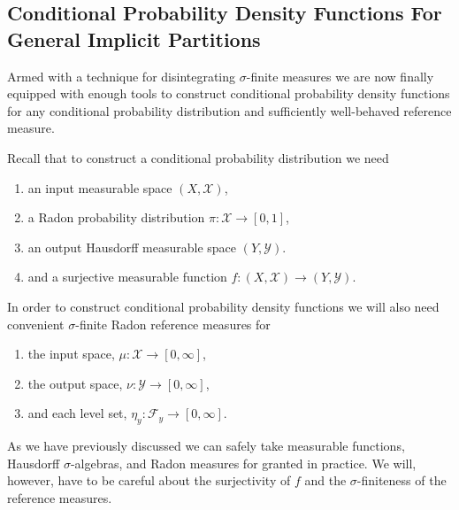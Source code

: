 \documentclass[
  letterpaper,
  DIV=11,
  numbers=noendperiod]{scrartcl}
\providecommand{\tightlist}{%
  \setlength{\itemsep}{0pt}\setlength{\parskip}{0pt}}\usepackage{longtable,booktabs,array}
\begin{document}
\subsection{Conditional Probability Density Functions For General
Implicit
Partitions}\label{conditional-probability-density-functions-for-general-implicit-partitions}

Armed with a technique for disintegrating \(\sigma\)-finite measures we
are now finally equipped with enough tools to construct conditional
probability density functions for any conditional probability
distribution and sufficiently well-behaved reference measure.

Recall that to construct a conditional probability distribution we need

\begin{enumerate}
\def\labelenumi{\arabic{enumi}.}
\tightlist
\item
  an input measurable space \((X, \mathcal{X})\),
\item
  a Radon probability distribution
  \(\pi : \mathcal{X} \rightarrow [0, 1]\),
\item
  an output Hausdorff measurable space \((Y, \mathcal{Y})\).
\item
  and a surjective measurable function
  \(f: (X, \mathcal{X}) \rightarrow (Y, \mathcal{Y})\).
\end{enumerate}

In order to construct conditional probability density functions we will
also need convenient \(\sigma\)-finite Radon reference measures for

\begin{enumerate}
\def\labelenumi{\arabic{enumi}.}
\setcounter{enumi}{4}
\tightlist
\item
  the input space, \(\mu : \mathcal{X} \rightarrow [0, \infty]\),
\item
  the output space, \(\nu : \mathcal{Y} \rightarrow [0, \infty]\),
\item
  and each level set,
  \(\eta_{y} : \mathcal{F}_{y} \rightarrow [0, \infty]\).
\end{enumerate}

As we have previously discussed we can safely take measurable functions,
Hausdorff \(\sigma\)-algebras, and Radon measures for granted in
practice. We will, however, have to be careful about the surjectivity of
\(f\) and the \(\sigma\)-finiteness of the reference measures.
\end{document}
